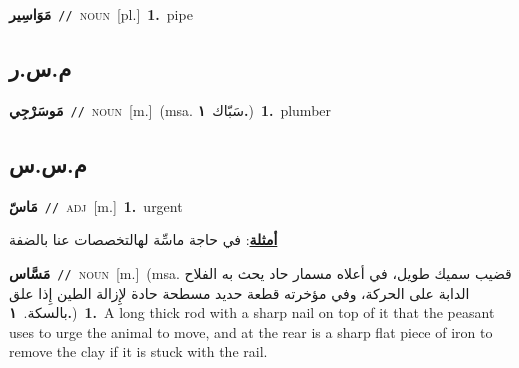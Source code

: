 \documentclass[10pt,a4paper,twoside]{article} %
\begin{document}
\begin{multicols}{2}
{\setlength\topsep{0pt}\textbf{\foreignlanguage{arabic}{مَوَاسِير}}\ {\color{gray}\texttt{//}\color{black}}\ \textsc{noun}\ [pl.]\ \textbf{1.}~pipe\ } \vspace{2mm}

\vspace{-3mm}
\subsection*{\color{blue}\foreignlanguage{arabic}{م.س.ر}\color{blue}{ (ntws)}} 

{\setlength\topsep{0pt}\textbf{\foreignlanguage{arabic}{مَوسَرْجِي}}\ {\color{gray}\texttt{//}\color{black}}\ \textsc{noun}\ [m.]\ \color{gray}(msa. \foreignlanguage{arabic}{سَبّاك}~\foreignlanguage{arabic}{\textbf{١.}})\color{black}\ \textbf{1.}~plumber\ } \vspace{2mm}

\vspace{-3mm}
\subsection*{\color{blue}\foreignlanguage{arabic}{م.س.س}\color{blue}{}} 

{\setlength\topsep{0pt}\textbf{\foreignlanguage{arabic}{مَاسّ}}\ {\color{gray}\texttt{//}\color{black}}\ \textsc{adj}\ [m.]\ \textbf{1.}~urgent\  \begin{flushright}\color{gray}\foreignlanguage{arabic}{\textbf{\underline{\foreignlanguage{arabic}{أمثلة}}}: في حاجة ماسِّة لهالتخصصات عنا بالضفة}\end{flushright}\color{black}} \vspace{2mm}

{\setlength\topsep{0pt}\textbf{\foreignlanguage{arabic}{مَسَّاس}}\ {\color{gray}\texttt{//}\color{black}}\ \textsc{noun}\ [m.]\ \color{gray}(msa. \foreignlanguage{arabic}{قضيب سميك طويل، في أعلاه مسمار حاد يحث به الفلاح الدابة على الحركة، وفي مؤخرته قطعة حديد مسطحة حادة لإِزالة الطين إِذا علق بالسكة.}~\foreignlanguage{arabic}{\textbf{١.}})\color{black}\ \textbf{1.}~A long thick rod with a sharp nail on top of it that the peasant uses to urge the animal to move, and at the rear is a sharp flat piece of iron to remove the clay if it is stuck with the rail.\ } \vspace{2mm}


\end{multicols}
\end{document}
